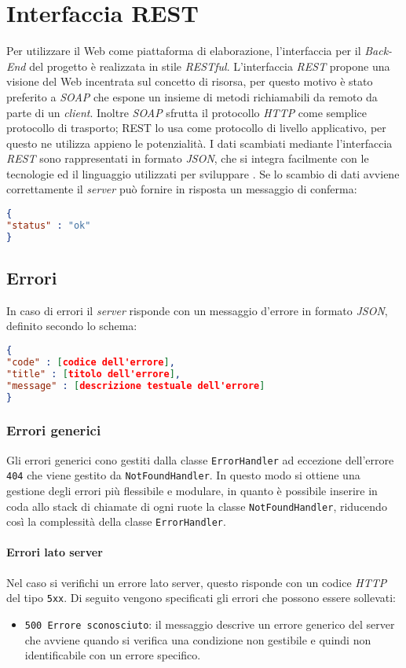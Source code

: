 \newpage
\section{Interfaccia REST}
Per utilizzare il Web come piattaforma di elaborazione, l'interfaccia per il \textit{Back-End} del progetto \textit{\progetto} è realizzata in stile \textit{RESTful}.
L'interfaccia \textit{REST} propone una visione del Web incentrata sul concetto di risorsa, per questo motivo è stato preferito a \textit{SOAP} che espone un insieme di metodi richiamabili da remoto da parte di un \textit{client}. Inoltre \textit{SOAP} sfrutta il protocollo \textit{HTTP} come semplice protocollo di trasporto; REST lo usa come  protocollo di livello applicativo, per questo ne utilizza appieno le potenzialità.
I dati scambiati mediante l'interfaccia \textit{REST} sono rappresentati in formato \textit{JSON}, che si integra facilmente con le tecnologie ed il linguaggio utilizzati per sviluppare \progetto.
Se lo scambio di dati avviene correttamente il \textit{server} può fornire in risposta un messaggio di conferma:
\begin{lstlisting}[language=json,firstnumber=1]
{
"status" : "ok"
}
\end{lstlisting}
\subsection{Errori}
In caso di errori il \textit{server} risponde con un messaggio d'errore in formato \textit{JSON}, definito secondo lo schema:
\begin{lstlisting}[language=json,firstnumber=1]
{
"code" : [codice dell'errore],
"title" : [titolo dell'errore],
"message" : [descrizione testuale dell'errore]
}
\end{lstlisting}
\subsubsection{Errori generici}
Gli errori generici cono gestiti dalla classe \texttt{ErrorHandler} ad eccezione dell'errore \texttt{404} che viene gestito da \texttt{NotFoundHandler}. In questo modo si ottiene una gestione degli errori più flessibile e modulare, in quanto è possibile inserire in coda allo stack di chiamate di ogni ruote la classe \texttt{NotFoundHandler}, riducendo così la complessità della classe \texttt{ErrorHandler}.

\paragraph{Errori lato server}
Nel caso si verifichi un errore lato server, questo risponde con un codice \textit{HTTP} del tipo \texttt{5xx}. Di seguito vengono specificati gli errori che possono essere sollevati:
	\begin{itemize}
		\item \texttt{500 Errore sconosciuto}: il messaggio descrive un errore generico del server che avviene quando si verifica una condizione non gestibile e quindi non identificabile con un errore specifico.
	\end{itemize}
